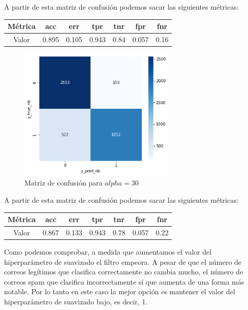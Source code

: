 \documentclass[conference,a4paper]{IEEEtran}
\begin{document}
A partir de esta matriz de confusión podemos sacar las siguientes métricas:

\begin{center}
\begin{tabular}[H]{ |c|c|c|c|c|c|c| }
 \hline
 Métrica & acc & err & tpr & tnr & fpr & fnr \\ 
 \hline
 Valor & 0.895 & 0.105 & 0.943 & 0.84 & 0.057 & 0.16 \\ 
 \hline
\end{tabular}
\end{center}

\begin{figure}[h]
  \centering
  \includegraphics[width=75mm]{nb_30}
  \caption{Matriz de confusión para $alpha=30$}
  \label{fig:ejemplo}
\end{figure}

A partir de esta matriz de confusión podemos sacar las siguientes métricas:

\begin{center}
\begin{tabular}[h]{ |c|c|c|c|c|c|c| } 
 \hline
 Métrica & acc & err & tpr & tnr & fpr & fnr \\ 
 \hline
 Valor & 0.867 & 0.133 & 0.943 & 0.78 & 0.057 & 0.22 \\ 
 \hline
\end{tabular}
\end{center}

Como podemos comprobar, a medida que aumentamos el valor del hiperparámetro de suavizado el filtro empeora. A pesar de que el número de correos legítimos que clasifica correctamente no cambia mucho, el número de correos spam que clasifica incorrectamente sí que aumenta de una forma más notable. Por lo tanto en este caso la mejor opción es mantener el valor del hiperparámetro de suavizado bajo, es decir, 1. \\
\end{document}
